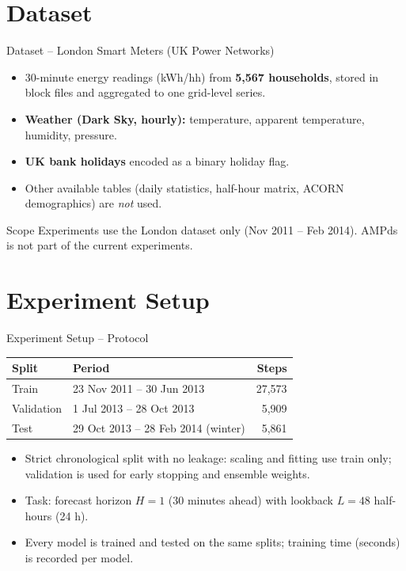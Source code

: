 \documentclass[aspectratio=169]{beamer}
\begin{document}
\section{Dataset}
\begin{frame}{Dataset -- London Smart Meters (UK Power Networks)}
  \begin{itemize}
    \item 30-minute energy readings (kWh/hh) from \textbf{5,567 households}, stored in block files and aggregated to one grid-level series.
    \item \textbf{Weather (Dark Sky, hourly):} temperature, apparent temperature, humidity, pressure.
    \item \textbf{UK bank holidays} encoded as a binary holiday flag.
    \item Other available tables (daily statistics, half-hour matrix, ACORN demographics) are \emph{not} used.
  \end{itemize}
  \vspace{4pt}
  \begin{alertblock}{Scope}
    Experiments use the London dataset only (Nov 2011 -- Feb 2014). AMPds is not part of the current experiments.
  \end{alertblock}
\end{frame}

\section{Experiment Setup}
\begin{frame}{Experiment Setup -- Protocol}
  \small
  \begin{tabular}{p{2.6cm}p{5.2cm}r}
    \toprule
    \textbf{Split} & \textbf{Period} & \textbf{Steps} \\ \midrule
    Train & 23 Nov 2011 -- 30 Jun 2013 & 27,573 \\
    Validation & 1 Jul 2013 -- 28 Oct 2013 & 5,909 \\
    Test & 29 Oct 2013 -- 28 Feb 2014 (winter) & 5,861 \\ \bottomrule
  \end{tabular}
  \vspace{6pt}
  \begin{itemize}
    \item Strict chronological split with no leakage: scaling and fitting use train only; validation is used for early stopping and ensemble weights.
    \item Task: forecast horizon $H=1$ (30 minutes ahead) with lookback $L=48$ half-hours (24 h).
    \item Every model is trained and tested on the same splits; training time (seconds) is recorded per model.
  \end{itemize}
\end{frame}
\end{document}
